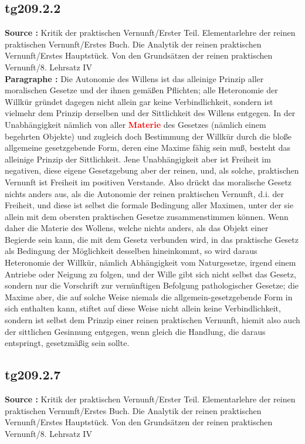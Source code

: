 \documentclass[a4paper,12pt,twoside]{book}
\newcommand{\match}[1]{\textcolor{red}{\textbf{#1}}}
\begin{document}
	\subsection*{tg209.2.2} 
	\textbf{Source : }Kritik der praktischen Vernunft/Erster Teil. Elementarlehre der reinen praktischen Vernunft/Erstes Buch. Die Analytik der reinen praktischen Vernunft/Erstes Hauptstück. Von den Grundsätzen der reinen praktischen Vernunft/8. Lehrsatz IV\\  
	
	\noindent\textbf{Paragraphe : }Die Autonomie des Willens ist das alleinige Prinzip aller moralischen Gesetze und der ihnen gemäßen Pflichten; alle Heteronomie der Willkür gründet dagegen nicht allein gar keine Verbindlichkeit, sondern ist vielmehr dem Prinzip derselben und der Sittlichkeit des Willens entgegen. In der Unabhängigkeit nämlich von aller \match{Materie} des Gesetzes (nämlich einem begehrten Objekte) und zugleich doch Bestimmung der Willkür durch die bloße allgemeine gesetzgebende Form, deren eine Maxime fähig sein muß, besteht das alleinige Prinzip der Sittlichkeit. Jene Unabhängigkeit aber ist Freiheit im negativen, diese eigene Gesetzgebung aber der reinen, und, als solche, praktischen Vernunft ist Freiheit im positiven Verstande. Also drückt das moralische Gesetz nichts anders aus, als die Autonomie der reinen praktischen Vernunft, d.i. der Freiheit, und diese ist selbst die formale Bedingung aller Maximen, unter der sie allein mit dem obersten praktischen Gesetze zusammenstimmen können. Wenn daher die Materie des Wollens, welche nichts anders, als das Objekt einer Begierde sein kann, die mit dem Gesetz verbunden wird, in das praktische Gesetz als Bedingung der Möglichkeit desselben hineinkommt, so wird daraus Heteronomie der Willkür, nämlich Abhängigkeit vom Naturgesetze, irgend einem Antriebe oder Neigung zu folgen, und der Wille gibt sich nicht selbst das Gesetz, sondern nur die Vorschrift zur vernünftigen Befolgung pathologischer Gesetze; die Maxime aber, die auf solche Weise niemals die allgemein-gesetzgebende Form in sich enthalten kann, stiftet auf diese Weise nicht allein keine Verbindlichkeit, sondern ist selbst dem Prinzip einer reinen praktischen Vernunft, hiemit also auch der  sittlichen Gesinnung entgegen, wenn gleich die Handlung, die daraus entspringt, gesetzmäßig sein sollte. 
	
	\subsection*{tg209.2.7} 
	\textbf{Source : }Kritik der praktischen Vernunft/Erster Teil. Elementarlehre der reinen praktischen Vernunft/Erstes Buch. Die Analytik der reinen praktischen Vernunft/Erstes Hauptstück. Von den Grundsätzen der reinen praktischen Vernunft/8. Lehrsatz IV\\  
	
\end{document}
